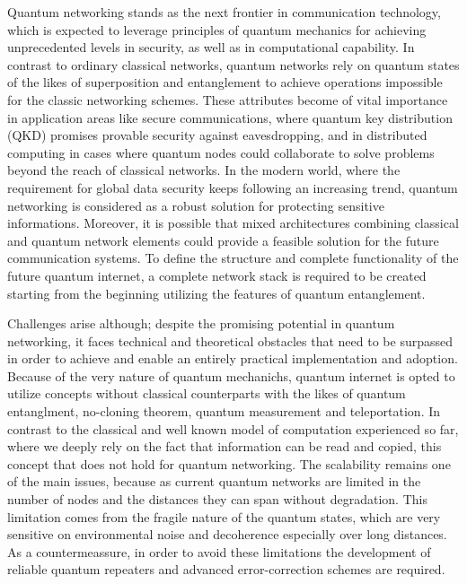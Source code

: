 \documentclass[12pt,a4paper] {report}
\begin{document}
		Quantum networking stands as the next frontier in communication technology,
		which is expected to leverage principles of quantum mechanics for
		achieving unprecedented levels in security, as well as in computational capability.
		In contrast to ordinary classical networks, quantum networks rely on quantum states
		of the likes of superposition and entanglement to achieve operations impossible for
	        the classic networking schemes. These attributes become of vital importance in 
		application areas like secure communications, where quantum key distribution (QKD) 
		promises provable security against eavesdropping, and in distributed computing in cases 
		where quantum nodes could collaborate to solve problems beyond the reach of classical networks.
		In the modern world, where the requirement for global data security keeps following
		an increasing trend, quantum networking is considered as a robust solution
		for protecting sensitive informations.
		Moreover, it is possible that mixed architectures combining classical and quantum network elements
		could provide a feasible solution for the future communication systems. 
		To define the structure and complete functionality of the future quantum internet,
		a complete network stack is required to be created starting from the beginning utilizing 
		the features of quantum entanglement\cite{rfc}.

		Challenges arise although; despite the promising potential in quantum networking,
		it faces technical and theoretical obstacles that need to be surpassed
		in order to achieve and enable an entirely practical implementation and adoption.
		Because of the very nature of quantum mechanichs, quantum internet is opted to utilize concepts
		without classical counterparts with the likes of quantum entanglment,
		no-cloning theorem, quantum measurement and teleportation.
		In contrast to the classical and well known model of computation experienced so far,
		where we deeply rely on the fact that information can be read and copied, this concept that does not hold
		for quantum networking. 
		The scalability remains one of the main issues,
		because as current quantum networks are limited in the number of nodes and the
		distances they can span without degradation.
		This limitation comes from the fragile nature of the quantum states,
		which are very sensitive on environmental noise and decoherence especially over long distances.
		As a countermeassure, in order to avoid these limitations the development of reliable quantum repeaters
		and advanced error-correction schemes are required. 
		
\end{document}
